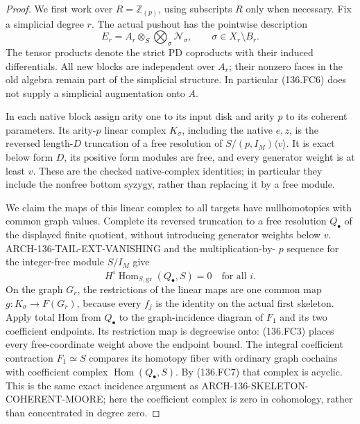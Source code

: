 \begin{proof}
We first work over \(R=\mathbb Z_{(p)}\), using subscripts
\(R\) only when necessary. Fix a simplicial degree \(r\).
The actual pushout has the pointwise description
\[
              E_r=A_r\otimes_S\bigotimes_{\sigma}\mathcal N_\sigma,
                   \qquad \sigma\in X_r\setminus B_r.  \tag{136.FC6}
\]
The tensor products denote the strict PD coproducts with their
induced differentials. All new blocks are independent over
\(A_r\); their nonzero faces in the old algebra remain part
of the simplicial structure. In particular (136.FC6) does not
supply a simplicial augmentation onto \(A\).

In each native block assign arity one to its input disk and
arity \(p\) to its coherent parameters. Its arity-\(p\)
linear complex \(K_\sigma\), including the native
\(e,z\), is the reversed length-\(D\) truncation of a
free resolution of
\(S/(p,I_M)\langle v\rangle\). It is exact below form
\(D\), its positive form modules are free, and every
generator weight is at least \(v\). These are the checked
native-complex identities; in particular they include the
nonfree bottom syzygy, rather than replacing it by a free module.

We claim the maps of this linear complex to all targets have
nullhomotopies with common graph values. Complete its reversed
truncation to a free resolution \(Q_\bullet\) of the displayed
finite quotient, without introducing generator weights below
\(v\). ARCH-136-TAIL-EXT-VANISHING and the multiplication-by-
\(p\) sequence for the integer-free module \(S/I_M\) give
\[
 H^i\operatorname{Hom}_{S,\mathrm{gr}}(Q_\bullet,S)=0
                                      \quad\text{for all }i.
                                                               \tag{136.FC7}
\]
On the graph \(G_r\), the restrictions of the linear maps
are one common map \(g:K_\sigma\to F(G_r)\), because
every \(f_j\) is the identity on the actual first skeleton.
Apply total Hom from \(Q_\bullet\) to the graph-incidence
diagram of \(F_1\) and its two coefficient endpoints. Its
restriction map is degreewise onto: (136.FC3) places every
free-coordinate weight above the endpoint bound. The integral
coefficient contraction \(F_1\simeq S\) compares its
homotopy fiber with ordinary graph cochains with coefficient
complex \(\operatorname{Hom}(Q_\bullet,S)\). By
(136.FC7) that complex is acyclic. This is the same exact
incidence argument as ARCH-136-SKELETON-COHERENT-MOORE;
here the coefficient complex is zero in cohomology, rather
than concentrated in degree zero.


\end{proof}
